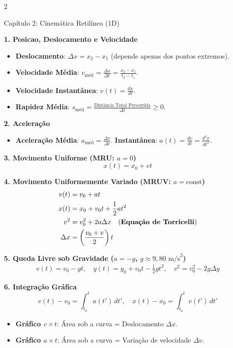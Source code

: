 \documentclass[9pt,a4paper]{article}
\begin{document}
\begin{multicols*}{2}
\begin{topicbox}{Capítulo 2: Cinemática Retilínea (1D)}

\textbf{1. Posicao, Deslocamento e Velocidade}
\begin{itemize}[leftmargin=*,itemsep=0pt]
    \item \textbf{Deslocamento}: $\Delta x = x_2 - x_1$ (depende apenas dos pontos extremos).
    \item \textbf{Velocidade Média}: $v_{\text{méd}} = \frac{\Delta x}{\Delta t} = \frac{x_2 - x_1}{t_2 - t_1}$.
    \item \textbf{Velocidade Instantânea}: $v(t) = \frac{dx}{dt}$.
    \item \textbf{Rapidez Média}: $s_{\text{méd}} = \frac{\text{Distância Total Percorrida}}{\Delta t} \ge 0$.
\end{itemize}

\textbf{2. Aceleração}
\begin{itemize}[leftmargin=*,itemsep=0pt]
    \item \textbf{Aceleração Média}: $a_{\text{méd}} = \frac{\Delta v}{\Delta t}$. \quad \textbf{Instantânea}: $a(t) = \frac{dv}{dt} = \frac{d^2 x}{dt^2}$.
\end{itemize}

\textbf{3. Movimento Uniforme (MRU: $a = 0$)}
\begin{equation*}
    x(t) = x_0 + v t
\end{equation*}

\textbf{4. Movimento Uniformemente Variado (MRUV: $a = \text{const}$)}
\begin{align*}
    v(t) &= v_0 + a t \\
    x(t) &= x_0 + v_0 t + \frac{1}{2} a t^2 \\
    v^2 &= v_0^2 + 2 a \Delta x \quad \text{(\textbf{Equação de Torricelli})} \\
    \Delta x &= \left(\frac{v_0 + v}{2}\right) t
\end{align*}

\textbf{5. Queda Livre sob Gravidade ($a = -g$, $g \approx 9,80\text{ m/s}^2$)}
\begin{align*}
    v(t) = v_0 - g t, \quad y(t) = y_0 + v_0 t - \frac{1}{2} g t^2, \quad v^2 = v_0^2 - 2 g \Delta y
\end{align*}

\textbf{6. Integração Gráfica}
\begin{equation*}
    v(t) - v_0 = \int_{t_0}^t a(t') \, dt', \quad x(t) - x_0 = \int_{t_0}^t v(t') \, dt'
\end{equation*}
\begin{itemize}[leftmargin=*,itemsep=0pt]
    \item \textbf{Gráfico $v \times t$}: Área sob a curva = Deslocamento $\Delta x$.
    \item \textbf{Gráfico $a \times t$}: Área sob a curva = Variação de velocidade $\Delta v$.
\end{itemize}


\end{topicbox}
\end{multicols*}
\end{document}
